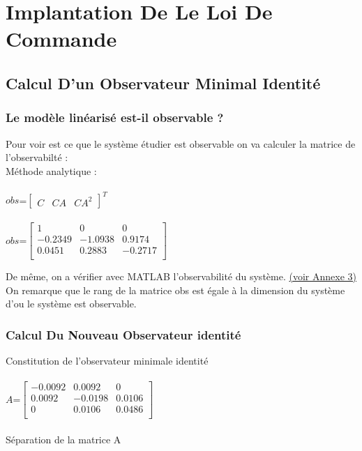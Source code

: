 \chapter{Implantation De Le Loi De Commande}
      
       
 
 
 \section{Calcul D’un Observateur Minimal Identité}

 \subsection{Le modèle linéarisé est-il observable ?}
 
 Pour voir est ce que le système étudier est observable   on va calculer la matrice de l'observabilté : \\
 Méthode analytique :\\\\
      $obs$=$\begin{bmatrix}
      C & CA & CA^{2}
      \end{bmatrix}^{T}$\\\\
      
      $obs$=$\begin{bmatrix}
      1 & 0 & 0 \\
      -0.2349 & -1.0938 & 0.9174 \\
      0.0451 & 0.2883 & -0.2717 \\
      \end{bmatrix}$
      
De même, on a vérifier avec MATLAB l'observabilité du système. \hyperref[section1.3]{(voir Annexe 3)}\label{annexe3}\\ 

 On remarque que le rang de la matrice obs est égale à la dimension du système d'ou le système est observable.
 
 \subsection{Calcul Du Nouveau Observateur identité }
Constitution de l'observateur minimale identité\\\\
$A$=$\begin{bmatrix}
-0.0092 & 0.0092 & 0 \\
0.0092 & -0.0198 & 0.0106\\
0 & 0.0106 & 0.0486\\
\end{bmatrix}$\\\\
Séparation de la matrice A 

